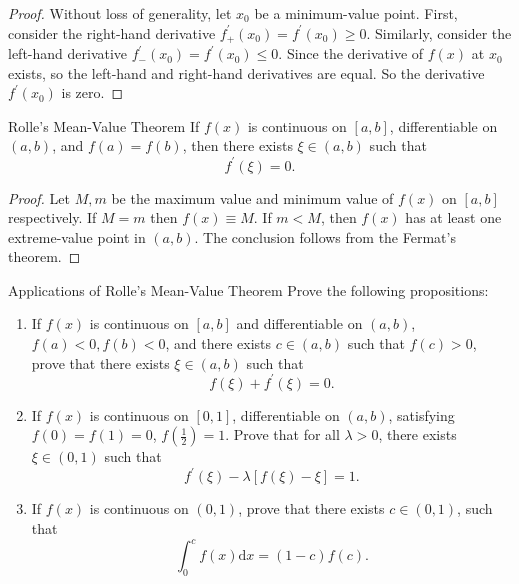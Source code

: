 \begin{proof}
  Without loss of generality, let $x_0$ be a minimum-value point.
  First, consider the right-hand derivative $f_+^{\prime}(x_0) = f^{\prime}(x_0)
  \geq 0$.
  Similarly, consider the left-hand derivative $f_-^{\prime}(x_0) =
  f^{\prime}(x_0) \leq 0$.
  Since the derivative of $f(x)$ at $x_0$ exists,
  so the left-hand and right-hand derivatives are equal.
  So the derivative $f^{\prime}(x_0)$ is zero.
\end{proof}

\begin{theorem}{Rolle's Mean-Value Theorem}{}
  If $f(x)$ is continuous on $[a, b]$,
  differentiable on $(a, b)$,
  and $f(a) = f(b)$,
  then there exists $\xi \in (a, b)$ such that
  \begin{equation}
    f^{\prime}(\xi) = 0.
  \end{equation}
\end{theorem}

\begin{proof}
  Let $M, m$ be the maximum value and minimum value of $f(x)$ on $[a, b]$ respectively.
  If $M = m$ then $f(x) \equiv M$.
  If $m < M$, then $f(x)$ has at least one extreme-value point in $(a, b)$.
  The conclusion follows from the Fermat's theorem.
\end{proof}

\begin{example}{Applications of Rolle's Mean-Value Theorem}{}
  Prove the following propositions:
  \begin{enumerate}
  \item If $f(x)$ is continuous on $[a, b]$ and differentiable on $(a, b)$,
    $f(a) < 0, f(b) < 0$, and there exists $c \in (a, b)$ such that $f(c) > 0$,
    prove that there exists $\xi \in (a, b)$ such that
    \begin{equation}
      f(\xi) + f^{\prime}(\xi) = 0.
    \end{equation}
  \item If $f(x)$ is continuous on $[0, 1]$, differentiable on $(a, b)$,
    satisfying $f(0) = f(1) = 0$, $f(\frac{1}{2}) = 1$.
    Prove that for all $\lambda > 0$, there exists $\xi \in (0, 1)$ such that
    \begin{equation}
      f^{\prime}(\xi) - \lambda [f(\xi) - \xi] = 1.
    \end{equation}
  \item If $f(x)$ is continuous on $(0, 1)$, prove that there exists $c \in (0,
    1)$, such that
    \begin{equation}
      \int_0^cf(x)\mathrm{d}x = (1-c)f(c).
    \end{equation}
  \end{enumerate}
\end{example}

